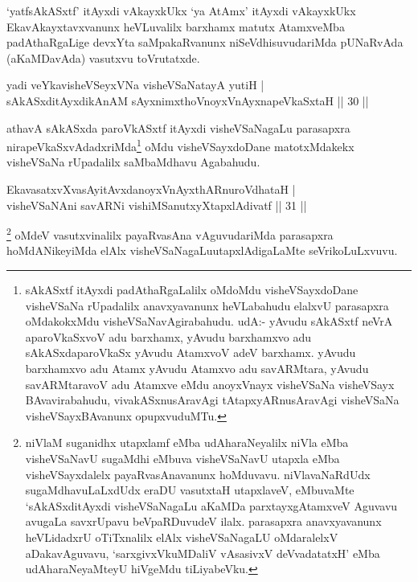 \begin{artha}
`yatfsAkASxtf' itAyxdi vAkayxkUkx `ya AtAmx' itAyxdi vAkayxkUkx EkavAkayxtavxvanunx heVLuvalilx barxhamx 
matutx AtamxveMba padAthaRgaLige devxYta saMpakaRvanunx niSeVdhisuvudariMda pUNaRvAda (aKaMDavAda) vasutxvu 
toVrutatxde.
\end{artha}


\begin{shl}
yadi veYkavisheVSeyxVNa visheVSaNatayA yutiH |\\
sAkASxditAyxdikAnAM sAyxnimxthoV\s noyxVnAyxnapeVkaSxtaH \hfill || 30 ||
\end{shl}

\begin{artha}
athavA  sAkASxda paroVkASxtf itAyxdi visheVSaNagaLu parasapxra nirapeVkaSxvAdadxriMda\footnote[1]{sAkASxtf itAyxdi padAthaRgaLalilx oMdoMdu visheVSayxdoDane visheVSaNa rUpadalilx anavxyavanunx heVLabahudu elalxvU parasapxra oMdakokxMdu visheVSaNavAgirabahudu. udA:- yAvudu sAkASxtf neVrA aparoVkaSxvoV adu barxhamx, yAvudu barxhamxvo adu sAkASxdaparoVkaSx yAvudu AtamxvoV adeV barxhamx. yAvudu barxhamxvo adu Atamx yAvudu Atamxvo adu savARMtara, yAvudu savARMtaravoV adu Atamxve eMdu anoyxVnayx visheVSaNa visheVSayx BAvavirabahudu, vivakASxnusAravAgi tAtapxyARnusAravAgi visheVSaNa visheVSayxBAvanunx opupxvuduMTu.} oMdu visheVSayxdoDane matotxMdakekx visheVSaNa rUpadalilx saMbaMdhavu Agabahudu.
\end{artha}


\begin{shl}
EkavasatxvXvasAyitAvxdanoyxVnAyxthARnuroVdhataH |\\
visheVSaNAni savARNi vishiMSanutxyXtapxlAdivatf \hfill || 31 ||
\end{shl}

\begin{artha}
\footnote[2]{niVlaM suganidhx utapxlamf eMba udAharaNeyalilx niVla eMba visheVSaNavU sugaMdhi eMbuva visheVSaNavU utapxla eMba
visheVSayxdalelx payaRvasAnavanunx hoMduvavu. niVlavaNaRdUdx sugaMdhavuLaLxdUdx eraDU vasutxtaH utapxlaveV, eMbuvaMte `sAkASxditAyxdi visheVSaNagaLu aKaMDa parxtayxgAtamxveV Aguvavu avugaLa savxrUpavu beVpaRDuvudeV ilalx. parasapxra anavxyavanunx heVLidadxrU oTiTxnalilx elAlx visheVSaNagaLU oMdaralelxV aDakavAguvavu, `sarxgivxVkuMDaliV vAsasivxV deVvadatatxH' eMba udAharaNeyaMteyU hiVgeMdu tiLiyabeVku.} oMdeV vasutxvinalilx payaRvasAna vAguvudariMda parasapxra hoMdANikeyiMda elAlx visheVSaNagaLu\footnotemark[2]utapxlAdigaLaMte seVrikoLuLxvuvu.
\end{artha}

